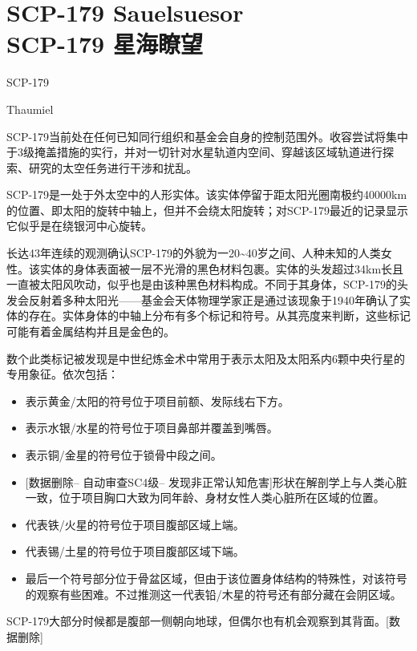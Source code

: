 \chapter[SCP-179 星海瞭望]{
    SCP-179 Sauelsuesor\\
    SCP-179 星海瞭望
}

\label{chap:SCP-179}

SCP-179

 Thaumiel

SCP-179当前处在任何已知同行组织和基金会自身的控制范围外。收容尝试将集中于3级掩盖措施的实行，并对一切针对水星轨道内空间、穿越该区域轨道进行探索、研究的太空任务进行干涉和扰乱。

SCP-179是一处于外太空中的人形实体。该实体停留于距太阳光圈南极约40000km的位置、即太阳的旋转中轴上，但并不会绕太阳旋转；对SCP-179最近的记录显示它似乎是在绕银河中心旋转。

长达43年连续的观测确认SCP-179的外貌为一20\~{}40岁之间、人种未知的人类女性。该实体的身体表面被一层不光滑的黑色材料包裹。实体的头发超过34km长且一直被太阳风吹动，似乎也是由该种黑色材料构成。不同于其身体，SCP-179的头发会反射着多种太阳光——基金会天体物理学家正是通过该现象于1940年确认了实体的存在。实体身体的中轴上分布有多个标记和符号。从其亮度来判断，这些标记可能有着金属结构并且是金色的。

数个此类标记被发现是中世纪炼金术中常用于表示太阳及太阳系内6颗中央行星的专用象征。依次包括：

\begin{itemize}
\item 表示黄金\slash 太阳的符号位于项目前额、发际线右下方。
\item 表示水银\slash 水星的符号位于项目鼻部并覆盖到嘴唇。
\item 表示铜\slash 金星的符号位于锁骨中段之间。
\item {[}数据删除– 自动审查SC4级– 发现非正常认知危害]形状在解剖学上与人类心脏一致，位于项目胸口大致为同年龄、身材女性人类心脏所在区域的位置。
\item 代表铁\slash 火星的符号位于项目腹部区域上端。
\item 代表锡\slash 土星的符号位于项目腹部区域下端。
\item 最后一个符号部分位于骨盆区域，但由于该位置身体结构的特殊性，对该符号的观察有些困难。不过推测这一代表铅\slash 木星的符号还有部分藏在会阴区域。
\end{itemize}

SCP-179大部分时候都是腹部一侧朝向地球，但偶尔也有机会观察到其背面。{[}数据删除]

